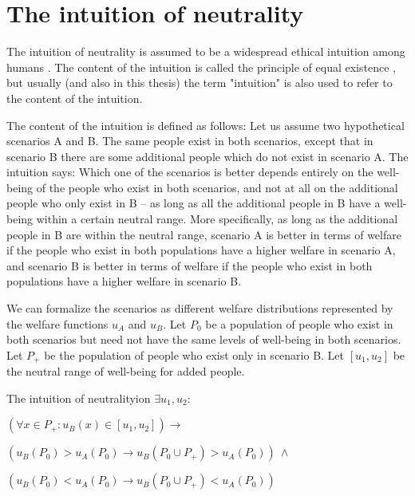 \section{The intuition of neutrality}

The intuition of neutrality is assumed to be a widespread ethical intuition among humans \cite[p.~176f]{broome_2012}. The content of the intuition is called the principle of equal existence \cite[p.~146]{broome_2004}, but usually (and also in this thesis) the term "intuition" is also used to refer to the content of the intuition. 

The content of the intuition is defined as follows: Let us assume two hypothetical scenarios A and B. The same people exist in both scenarios, except that in scenario B there are some additional people which do not exist in scenario A. The intuition says: Which one of the scenarios is better depends entirely on the well-being of the people who exist in both scenarios, and not at all on the additional people who only exist in B – as long as all the additional people in B have a well-being within a certain neutral range. More specifically, as long as the additional people in B are within the neutral range, scenario A is better in terms of welfare if the people who exist in both populations have a higher welfare in scenario A, and scenario B is better in terms of welfare if the people who exist in both populations have a higher welfare in scenario B.  

We can formalize the scenarios as different welfare distributions represented by the welfare functions $u_A$ and $u_B$. Let $P_0$ be a population of people who exist in both scenarios but need not have the same levels of well-being in both scenarios. Let $P_+$ be the population of people who exist only in scenario B. Let $[u_1, u_2]$ be the neutral range of well-being for added people. 

\begin{Definition}{The intuition of neutrality}{ion} 
$
  \exists u_1, u_2: 
$

\hspace{.5cm} $
  (\forall x \in P_+ : u_B(x) \in [u_1, u_2] )
  \rightarrow 
$

\hspace{1cm} $
  ( u_B(P_0) > u_A(P_0) 
  \rightarrow 
  u_B(P_0 \cup P_+) > u_A(P_0) ) 
  \ \wedge
$  

\hspace{1cm} $
  ( u_B(P_0) < u_A(P_0) 
  \rightarrow 
  u_B(P_0 \cup P_+) < u_A(P_0) ) 
$
\end{Definition}

